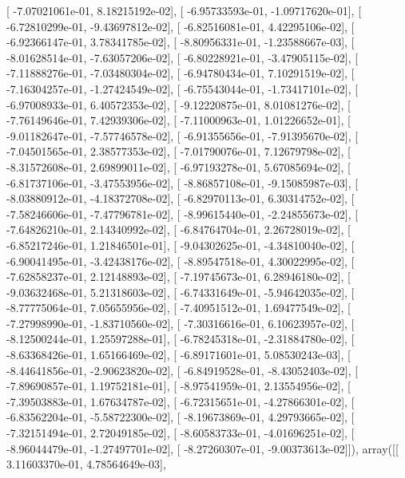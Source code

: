 \documentclass{article}
\begin{document}
       [ -7.07021061e-01,   8.18215192e-02],
       [ -6.95733593e-01,  -1.09717620e-01],
       [ -6.72810299e-01,  -9.43697812e-02],
       [ -6.82516081e-01,   4.42295106e-02],
       [ -6.92366147e-01,   3.78341785e-02],
       [ -8.80956331e-01,  -1.23588667e-03],
       [ -8.01628514e-01,  -7.63057206e-02],
       [ -6.80228921e-01,  -3.47905115e-02],
       [ -7.11888276e-01,  -7.03480304e-02],
       [ -6.94780434e-01,   7.10291519e-02],
       [ -7.16304257e-01,  -1.27424549e-02],
       [ -6.75543044e-01,  -1.73417101e-02],
       [ -6.97008933e-01,   6.40572353e-02],
       [ -9.12220875e-01,   8.01081276e-02],
       [ -7.76149646e-01,   7.42939306e-02],
       [ -7.11000963e-01,   1.01226652e-01],
       [ -9.01182647e-01,  -7.57746578e-02],
       [ -6.91355656e-01,  -7.91395670e-02],
       [ -7.04501565e-01,   2.38577353e-02],
       [ -7.01790076e-01,   7.12679798e-02],
       [ -8.31572608e-01,   2.69899011e-02],
       [ -6.97193278e-01,   5.67085694e-02],
       [ -6.81737106e-01,  -3.47553956e-02],
       [ -8.86857108e-01,  -9.15085987e-03],
       [ -8.03880912e-01,  -4.18372708e-02],
       [ -6.82970113e-01,   6.30314752e-02],
       [ -7.58246606e-01,  -7.47796781e-02],
       [ -8.99615440e-01,  -2.24855673e-02],
       [ -7.64826210e-01,   2.14340992e-02],
       [ -6.84764704e-01,   2.26728019e-02],
       [ -6.85217246e-01,   1.21846501e-01],
       [ -9.04302625e-01,  -4.34810040e-02],
       [ -6.90041495e-01,  -3.42438176e-02],
       [ -8.89547518e-01,   4.30022995e-02],
       [ -7.62858237e-01,   2.12148893e-02],
       [ -7.19745673e-01,   6.28946180e-02],
       [ -9.03632468e-01,   5.21318603e-02],
       [ -6.74331649e-01,  -5.94642035e-02],
       [ -8.77775064e-01,   7.05655956e-02],
       [ -7.40951512e-01,   1.69477549e-02],
       [ -7.27998990e-01,  -1.83710560e-02],
       [ -7.30316616e-01,   6.10623957e-02],
       [ -8.12500244e-01,   1.25597288e-01],
       [ -6.78245318e-01,  -2.31884780e-02],
       [ -8.63368426e-01,   1.65166469e-02],
       [ -6.89171601e-01,   5.08530243e-03],
       [ -8.44641856e-01,  -2.90623820e-02],
       [ -6.84919528e-01,  -8.43052403e-02],
       [ -7.89690857e-01,   1.19752181e-01],
       [ -8.97541959e-01,   2.13554956e-02],
       [ -7.39503883e-01,   1.67634787e-02],
       [ -6.72315651e-01,  -4.27866301e-02],
       [ -6.83562204e-01,  -5.58722300e-02],
       [ -8.19673869e-01,   4.29793665e-02],
       [ -7.32151494e-01,   2.72049185e-02],
       [ -8.60583733e-01,  -4.01696251e-02],
       [ -8.96044479e-01,  -1.27497701e-02],
       [ -8.27260307e-01,  -9.00373613e-02]]), array([[  3.11603370e-01,   4.78564649e-03],
\end{document}
